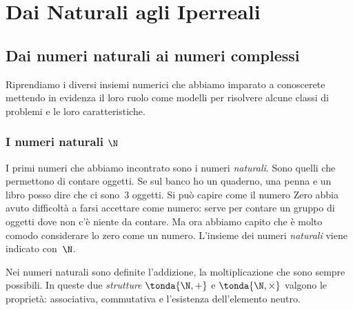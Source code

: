 



\chapter{Dai Naturali agli Iperreali}

\section{Dai numeri naturali ai numeri complessi}
\label{sec:01_introduzione}

Riprendiamo i diversi insiemi numerici che abbiamo imparato a conoscerete
mettendo in evidenza il loro ruolo come modelli per risolvere alcune classi 
di problemi e le loro caratteristiche.

\subsection{I numeri naturali \(\N\)}
\label{subsec:insnum_naturali}

I primi numeri che abbiamo incontrato sono i numeri \emph{naturali}. 
Sono quelli che permettono di contare oggetti. 
Se sul banco ho un quaderno, una penna e un libro posso dire che ci sono~3 
oggetti. 
Si può capire come il numero Zero abbia avuto difficoltà a farsi accettare 
come numero: serve per contare un gruppo di oggetti dove non c'è niente da 
contare. 
Ma ora abbiamo capito che è molto comodo considerare lo zero come un numero.
L'insieme dei numeri \emph{naturali} viene indicato con~\(\N\).

Nei numeri naturali sono definite l'addizione, la moltiplicazione che sono 
sempre possibili. In queste due \emph{strutture} \(\tonda{\N, +}\) e 
\(\tonda{\N, \times}\) valgono le proprietà: associativa, commutativa e 
l'esistenza dell'elemento neutro.

